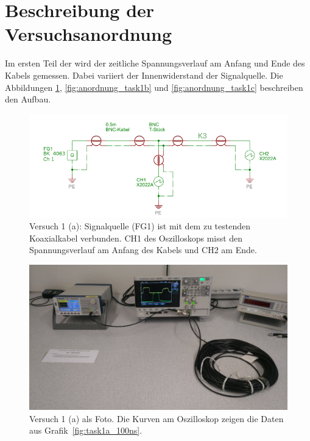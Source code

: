 \documentclass{article}
\begin{document}
\section{Beschreibung der Versuchsanordnung}

Im ersten Teil der wird der zeitliche Spannungsverlauf am Anfang und Ende des Kabels gemessen. Dabei variiert der Innenwiderstand der Signalquelle. Die Abbildungen \ref{fig:anordnung_task1a}, \ref{fig:anordnung_task1b} und \ref{fig:anordnung_task1c} beschreiben den Aufbau.


\begin{figure}[H]
\centering
\caption{Versuch 1 (a): Signalquelle (FG1) ist mit dem zu testenden Koaxialkabel verbunden. CH1 des Oszilloskops misst den Spannungsverlauf am Anfang des Kabels und CH2 am Ende.}
\label{fig:anordnung_task1a}
\includegraphics[scale=1.6]{task1a.png}
\end{figure}


\begin{figure}[H]
\centering
\caption{Versuch 1 (a) als Foto. Die Kurven am Oszilloskop zeigen die Daten aus Grafik~\ref{fig:task1a_100ns}.}
\label{fig:foto_task1a}
\includegraphics[scale=0.6]{foto_task1a.jpg}
\end{figure}
\end{document}
